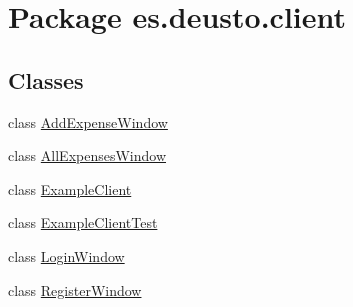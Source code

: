 \hypertarget{namespacees_1_1deusto_1_1client}{}\section{Package es.\+deusto.\+client}
\label{namespacees_1_1deusto_1_1client}
\subsection*{Classes}
\begin{DoxyCompactItemize}
\item 
class \hyperlink{classes_1_1deusto_1_1client_1_1_add_expense_window}{Add\+Expense\+Window}
\item 
class \hyperlink{classes_1_1deusto_1_1client_1_1_all_expenses_window}{All\+Expenses\+Window}
\item 
class \hyperlink{classes_1_1deusto_1_1client_1_1_example_client}{Example\+Client}
\item 
class \hyperlink{classes_1_1deusto_1_1client_1_1_example_client_test}{Example\+Client\+Test}
\item 
class \hyperlink{classes_1_1deusto_1_1client_1_1_login_window}{Login\+Window}
\item 
class \hyperlink{classes_1_1deusto_1_1client_1_1_register_window}{Register\+Window}
\end{DoxyCompactItemize}
